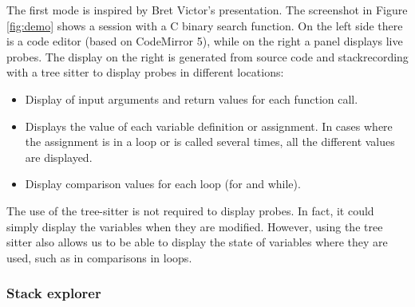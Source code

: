 \documentclass[english,submission]{programming}
\begin{document}
The first mode is inspired by Bret Victor's presentation. The screenshot in Figure \ref{fig:demo} shows a session with a C binary search function. 
On the left side there is a code editor (based on CodeMirror 5), while on the right a panel displays live probes. The display on the right is generated from source code and stackrecording with a tree sitter to display probes in different locations: 

\begin{itemize}
  \item Display of input arguments and return values for each function call.
  \item Displays the value of each variable definition or assignment. In cases where the assignment is in a loop or is called several times, all the different values are displayed.
  \item Display comparison values for each loop (for and while).
\end{itemize}

The use of the tree-sitter is not required to display probes. In fact, it could simply display the variables when they are modified. However, using the tree sitter also allows us to be able to display the state of variables where they are used, such as in comparisons in loops.

\subsubsection{Stack explorer}
\end{document}
